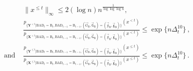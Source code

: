 \documentclass[11pt]{article}
\numberwithin{equation}{section}
\begin{document}
\begin{align}
    & \| x^{\leq t} \|_{\infty} \leq 2 (\log n) n^{\frac{1}{\log \log \log n}}, \label{equ-def-good-realization-mathbf-X-I} \\
    & \frac{ p_{ \{ \mathbf{Y}^{< t} | \mathrm{BAD}_t = \mathrm{B}_t , \mathrm{BAD}_{t-1} = \mathrm{B}_{t-1}, (\overrightarrow{G}_{\mathrm{B}}, \overrightarrow{\mathsf{G}}_{\mathrm{B}}) = (\overrightarrow{g}_{\mathrm{B}}, \overrightarrow{\mathsf{g}}_{\mathrm{B}}) \} } ( x^{< t} ) }{ p_{ \{ \mathbf{X}^{< t} | \mathrm{BAD}_t = \mathrm{B}_t, \mathrm{BAD}_{t-1} = \mathrm{B}_{t-1}, (\overrightarrow{G}_{\mathrm{B}}, \overrightarrow{\mathsf{G}}_{\mathrm{B}}) = (\overrightarrow{g}_{\mathrm{B}}, \overrightarrow{\mathsf{g}}_{\mathrm{B}}) \} } ( x^{< t} ) } \leq \exp \{ n \Delta_t^{10} \} \,,\label{equ-def-good-realization-mathbf-X-II}   \\
    \mbox{and } & \frac{ p_{ \{ \mathbf{Y}^{\leq t} | \mathrm{BAD}_t = \mathrm{B}_t, \mathrm{BAD}_{t-1} = \mathrm{B}_{t-1}, (\overrightarrow{G}_{\mathrm{B}}, \overrightarrow{\mathsf{G}}_{\mathrm{B}}) = (\overrightarrow{g}_{\mathrm{B}}, \overrightarrow{\mathsf{g}}_{\mathrm{B}}) \} } ( x^{\leq t} ) }{ p_{ \{ \mathbf{X}^{\leq t} | \mathrm{BAD}_t = \mathrm{B}_t, \mathrm{BAD}_{t-1} = \mathrm{B}_{t-1}, (\overrightarrow{G}_{\mathrm{B}}, \overrightarrow{\mathsf{G}}_{\mathrm{B}}) = (\overrightarrow{g}_{\mathrm{B}}, \overrightarrow{\mathsf{g}}_{\mathrm{B}}) \} } ( x^{\leq t} ) } \leq \exp \{ n \Delta_t^{10} \} \,.  \label{equ-def-good-realization-mathbf-X-III}
\end{align}
\end{document}
